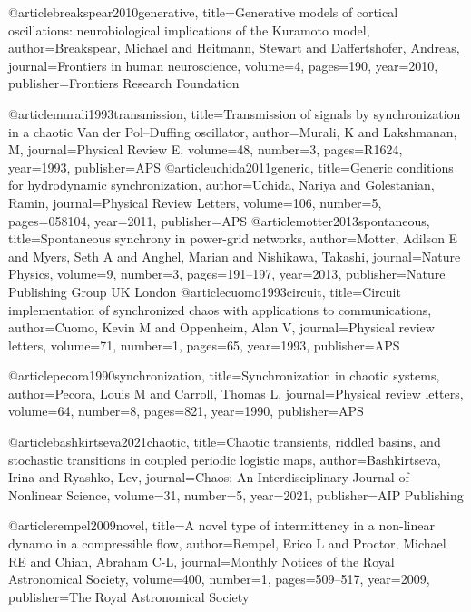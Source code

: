 @article{breakspear2010generative,
  title={Generative models of cortical oscillations: neurobiological implications of the Kuramoto model},
  author={Breakspear, Michael and Heitmann, Stewart and Daffertshofer, Andreas},
  journal={Frontiers in human neuroscience},
  volume={4},
  pages={190},
  year={2010},
  publisher={Frontiers Research Foundation}
}

@article{murali1993transmission,
  title={Transmission of signals by synchronization in a chaotic Van der Pol--Duffing oscillator},
  author={Murali, K and Lakshmanan, M},
  journal={Physical Review E},
  volume={48},
  number={3},
  pages={R1624},
  year={1993},
  publisher={APS}
}
@article{uchida2011generic,
  title={Generic conditions for hydrodynamic synchronization},
  author={Uchida, Nariya and Golestanian, Ramin},
  journal={Physical Review Letters},
  volume={106},
  number={5},
  pages={058104},
  year={2011},
  publisher={APS}
}
@article{motter2013spontaneous,
  title={Spontaneous synchrony in power-grid networks},
  author={Motter, Adilson E and Myers, Seth A and Anghel, Marian and Nishikawa, Takashi},
  journal={Nature Physics},
  volume={9},
  number={3},
  pages={191--197},
  year={2013},
  publisher={Nature Publishing Group UK London}
}
@article{cuomo1993circuit,
  title={Circuit implementation of synchronized chaos with applications to communications},
  author={Cuomo, Kevin M and Oppenheim, Alan V},
  journal={Physical review letters},
  volume={71},
  number={1},
  pages={65},
  year={1993},
  publisher={APS}
}





@article{pecora1990synchronization,
  title={Synchronization in chaotic systems},
  author={Pecora, Louis M and Carroll, Thomas L},
  journal={Physical review letters},
  volume={64},
  number={8},
  pages={821},
  year={1990},
  publisher={APS}
}



@article{bashkirtseva2021chaotic,
  title={Chaotic transients, riddled basins, and stochastic transitions in coupled periodic logistic maps},
  author={Bashkirtseva, Irina and Ryashko, Lev},
  journal={Chaos: An Interdisciplinary Journal of Nonlinear Science},
  volume={31},
  number={5},
  year={2021},
  publisher={AIP Publishing}
}

@article{rempel2009novel,
  title={A novel type of intermittency in a non-linear dynamo in a compressible flow},
  author={Rempel, Erico L and Proctor, Michael RE and Chian, Abraham C-L},
  journal={Monthly Notices of the Royal Astronomical Society},
  volume={400},
  number={1},
  pages={509--517},
  year={2009},
  publisher={The Royal Astronomical Society}
}


